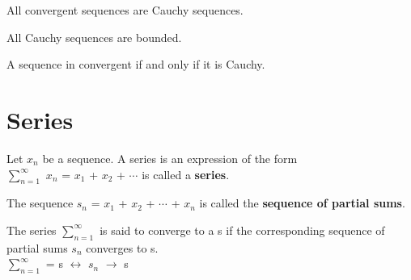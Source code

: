 \documentclass{report}
\begin{document}
\begin{theorem}
All convergent sequences are Cauchy sequences.
\end{theorem}

\begin{theorem}
All Cauchy sequences are bounded.
\end{theorem}

\begin{theorem}
A sequence in convergent if and only if it is Cauchy.
\end{theorem}

\section{Series}
\begin{definition}
Let $x_n$ be a sequence. A series is an expression of the form \\ 
$\sum_{n=1}^{\infty}$ $x_n$ = $x_1$ + $x_2$ + $\cdots$ is called a \textbf{series}.
\end{definition}

\begin{definition}
The sequence $s_n$ = $x_1$ + $x_2$ + $\cdots$ + $x_n$ is called the \textbf{sequence of partial sums}.
\end{definition}
The series $\sum_{n=1}^{\infty}$ is said to converge to a s if the corresponding sequence of partial sums $s_n$ converges to s.\\
$\sum_{n=1}^{\infty}$ = s $\leftrightarrow$  $s_n$ $\rightarrow$ s
\end{document}
